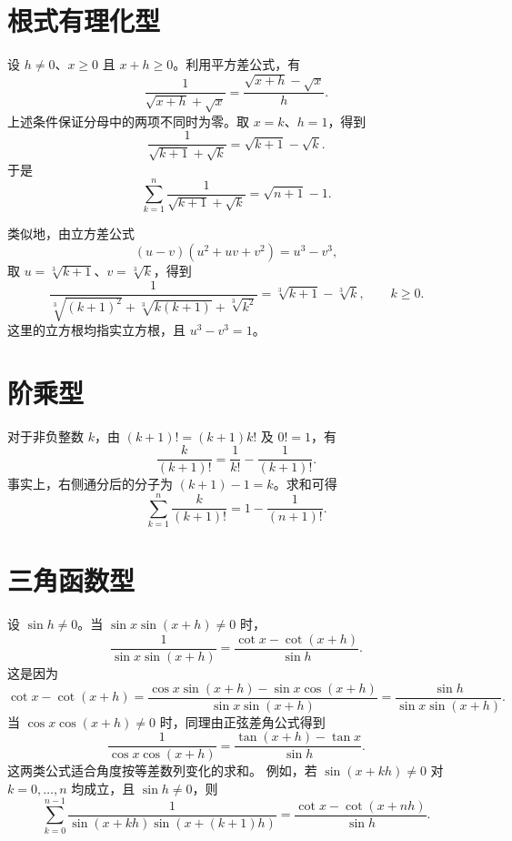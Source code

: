 \documentclass[UTF8]{ctexart}
\begin{document}
\section{根式有理化型}

设 $h\ne0$、$x\ge0$ 且 $x+h\ge0$。利用平方差公式，有
\begin{equation}\label{eq:square-root}
  \boxed{\frac1{\sqrt{x+h}+\sqrt{x}}
  =\frac{\sqrt{x+h}-\sqrt{x}}h}.
\end{equation}
上述条件保证分母中的两项不同时为零。取 $x=k$、$h=1$，得到
\[
  \frac1{\sqrt{k+1}+\sqrt{k}}=\sqrt{k+1}-\sqrt{k}.
\]
于是
\[
  \sum_{k=1}^{n}\frac1{\sqrt{k+1}+\sqrt{k}}
  =\sqrt{n+1}-1.
\]

类似地，由立方差公式
\[
  (u-v)(u^2+uv+v^2)=u^3-v^3,
\]
取 $u=\sqrt[3]{k+1}$、$v=\sqrt[3]{k}$，得到
\begin{equation}\label{eq:cube-root}
  \boxed{
  \frac1{\sqrt[3]{(k+1)^2}+\sqrt[3]{k(k+1)}+\sqrt[3]{k^2}}
  =\sqrt[3]{k+1}-\sqrt[3]{k}},\qquad k\ge0.
\end{equation}
这里的立方根均指实立方根，且 $u^3-v^3=1$。

\section{阶乘型}

对于非负整数 $k$，由 $(k+1)!=(k+1)k!$ 及 $0!=1$，有
\begin{equation}\label{eq:factorial}
  \boxed{\frac{k}{(k+1)!}
  =\frac1{k!}-\frac1{(k+1)!}}.
\end{equation}
事实上，右侧通分后的分子为 $(k+1)-1=k$。求和可得
\[
  \sum_{k=1}^{n}\frac{k}{(k+1)!}
  =1-\frac1{(n+1)!}.
\]

\section{三角函数型}

设 $\sin h\ne0$。当 $\sin x\sin(x+h)\ne0$ 时，
\begin{equation}\label{eq:cotangent}
  \boxed{\frac1{\sin x\sin(x+h)}
  =\frac{\cot x-\cot(x+h)}{\sin h}}.
\end{equation}
这是因为
\[
  \cot x-\cot(x+h)
  =\frac{\cos x\sin(x+h)-\sin x\cos(x+h)}{\sin x\sin(x+h)}
  =\frac{\sin h}{\sin x\sin(x+h)}.
\]
当 $\cos x\cos(x+h)\ne0$ 时，同理由正弦差角公式得到
\begin{equation}\label{eq:tangent}
  \boxed{\frac1{\cos x\cos(x+h)}
  =\frac{\tan(x+h)-\tan x}{\sin h}}.
\end{equation}
这两类公式适合角度按等差数列变化的求和。
例如，若 $\sin(x+kh)\ne0$ 对 $k=0,\ldots,n$ 均成立，且 $\sin h\ne0$，则
\[
  \sum_{k=0}^{n-1}\frac1{\sin(x+kh)\sin(x+(k+1)h)}
  =\frac{\cot x-\cot(x+nh)}{\sin h}.
\]
\end{document}
